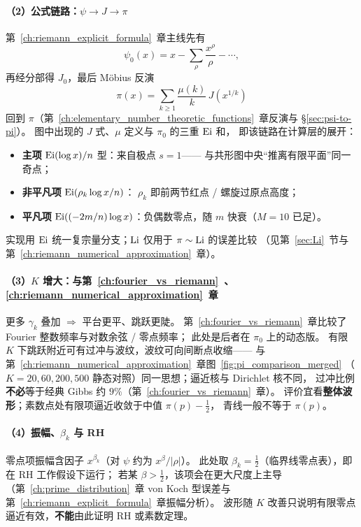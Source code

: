 \paragraph{（2）公式链路：$\psi\to J\to\pi$}
第~\ref{ch:riemann_explicit_formula}~章主线先有
\[
\psi_0(x)=x-\sum_{\rho}\frac{x^{\rho}}{\rho}-\cdots,
\]
再经分部得 $J_0$，最后 Möbius 反演
\[
\pi(x)=\sum_{k\ge 1}\frac{\mu(k)}{k}\,J(x^{1/k})
\]
回到 $\pi$（第~\ref{ch:elementary_number_theoretic_functions}~章反演与 §\ref{sec:psi-to-pi}）。
图中出现的 $J$ 式、$\mu$ 定义与 $\pi_0$ 的三重 $\operatorname{Ei}$ 和，
即该链路在计算层的展开：
\begin{itemize}
  \item \textbf{主项} $\operatorname{Ei}(\log x)/n$ 型：来自极点 $s=1$——
        与共形图中央“推离有限平面”同一奇点；
  \item \textbf{非平凡项} $\operatorname{Ei}(\rho_k\log x/n)$：
        $\rho_k$ 即前两节红点 / 螺旋过原点高度；
  \item \textbf{平凡项} $\operatorname{Ei}((-2m/n)\log x)$：负偶数零点，随 $m$ 快衰（$M=10$ 已足）。
\end{itemize}
实现用 $\operatorname{Ei}$ 统一复宗量分支；$\operatorname{Li}$ 仅用于 $\pi\sim\operatorname{Li}$ 的误差比较
（见第~\ref{sec:Li}~节与第~\ref{ch:riemann_numerical_approximation}~章）。

\paragraph{（3）$K$ 增大：与第~\ref{ch:fourier_vs_riemann}~、\ref{ch:riemann_numerical_approximation}~章}
更多 $\gamma_k$ 叠加 $\Rightarrow$ 平台更平、跳跃更陡。
第~\ref{ch:fourier_vs_riemann}~章比较了 Fourier 整数频率与对数余弦 / 零点频率；
此处是后者在 $\pi_0$ 上的动态版。
有限 $K$ 下跳跃附近可有过冲与波纹，波纹可向间断点收缩——
与第~\ref{ch:riemann_numerical_approximation}~章图~\ref{fig:pi_comparison_merged}
（$K=20,60,200,500$ 静态对照）同一思想；逼近核与 Dirichlet 核不同，
过冲比例\textbf{不必}等于经典 Gibbs 约 $9\%$（第~\ref{ch:fourier_vs_riemann}~章）。
评价宜看\textbf{整体波形}；素数点处有限项逼近收敛于中值 $\pi(p)-\frac12$，
青线一般不等于 $\pi(p)$。

\paragraph{（4）振幅、$\beta_k$ 与 RH}
零点项振幅含因子 $x^{\beta_k}$（对 $\psi$ 约为 $x^{\beta}/|\rho|$）。
此处取 $\beta_k=\frac12$（临界线零点表），即在 RH 工作假设下运行；
若某 $\beta>\frac12$，该项会在更大尺度上主导（第~\ref{ch:prime_distribution}~章
von Koch 型误差与第~\ref{ch:riemann_explicit_formula}~章振幅分析）。
波形随 $K$ 改善只说明有限零点逼近有效，\textbf{不能}由此证明 RH 或素数定理。

